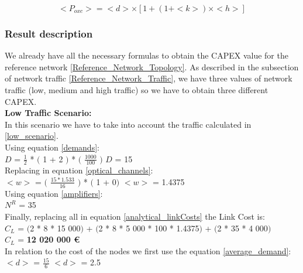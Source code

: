 \begin{equation}
<P_{oxc}> = <d> \times [1 + \left(1 + <k>\right) \times <h>]
\label{Poxc_transp}
\end{equation}
\vspace{11pt}


\subsubsection{Result description}

We already have all the necessary formulas to obtain the CAPEX value for the reference network \ref{Reference_Network_Topology}. As described in the subsection of network traffic \ref{Reference_Network_Traffic}, we have three values of network traffic (low, medium and high traffic) so we have to obtain three different CAPEX.\\
\newpage
\textbf{Low Traffic Scenario:}\\
In this scenario we have to take into account the traffic calculated in \ref{low_scenario}.\\

Using equation \ref{demands}:\\

$D$ = $\frac{1}{2}$ * $($ 1 + 2 $)$ * $($ $\frac{1000}{100}$ $)$ \qquad \qquad $D$ = 15\\

Replacing in equation \ref{optical_channels}:\\

$<w>$ = $($ $\frac{15 * 1.533}{16}$ $)$ * $($ 1 + 0$)$ \qquad \qquad $<w>$ = 1.4375\\

Using equation \ref{amplifiers}:\\

$N^R$ = 35\\

Finally, replacing all in equation \ref{analytical_linkCosts} the Link Cost is:\\

$C_L$ = $($2 * 8 * 15 000$)$ + $($2 * 8 * 5 000 * 100 * 1.4375$)$ + $($2 * 35 * 4 000$)$\\

$C_L$ = \textbf{12 020 000 \euro}\\

In relation to the cost of the nodes we first use the equation \ref{average_demand}:\\

$<d>$ = $\frac{15}{6}$ \qquad \qquad $<d>$ = 2.5\\

